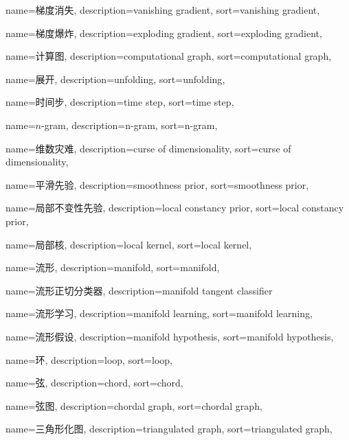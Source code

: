 {
	name=梯度消失,
	description={vanishing gradient},
	sort={vanishing gradient},
}

{
	name=梯度爆炸,
	description={exploding gradient},
	sort={exploding gradient},
}

{
  name=计算图,
  description={computational graph},
  sort={computational graph},
}

{
  name=展开,
  description={unfolding},
  sort={unfolding},
}

{
  name=时间步,
  description={time step},
  sort={time step},
}

{
  name=$n$-gram,
  description={n-gram},
  sort={n-gram},
}

{
  name=维数灾难,
  description={curse of dimensionality},
  sort={curse of dimensionality},
}

{
  name=平滑先验,
  description={smoothness prior},
  sort={smoothness prior},
}

{
  name=局部不变性先验,
  description={local constancy prior},
  sort={local constancy prior},
}

{
  name=局部核,
  description={local kernel},
  sort={local kernel},
}

{
  name=流形,
  description={manifold},
  sort={manifold},
}

{
  name=流形正切分类器,
  description={manifold tangent classifier}
}

{
  name=流形学习,
  description={manifold learning},
  sort={manifold learning},
}

{
  name=流形假设,
  description={manifold hypothesis},
  sort={manifold hypothesis},
}

{
  name=环,
  description={loop},
  sort={loop},
}

{
  name=弦,
  description={chord},
  sort={chord},
}

{
  name=弦图,
  description={chordal graph},
  sort={chordal graph},
}

{
  name=三角形化图,
  description={triangulated graph},
  sort={triangulated graph},
}

